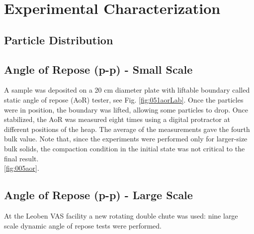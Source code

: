 
\chapter[Experimental Characterization]{Experimental Characterization}
\label{cap:experimentalcharacterization}




\section{Particle Distribution}
\label{sec:particledistribution}


\section{Angle of Repose (p-p) - Small Scale}
\label{sec:aor}

A sample was deposited on a 20 cm diameter plate with liftable boundary called
static angle of repose (\acs{AoR}) tester, see Fig. \ref{fig:051aorLab}.
Once the particles were in position, the boundary was lifted, allowing some particles to drop. 
Once stabilized, the \acs{AoR} was measured eight times using a digital protractor at different positions of the heap. 
The average of the measurements gave the fourth bulk value.
Note that, since the experiments were performed only for larger-size bulk
solids, the compaction condition in the initial state was not critical to the
final result.\\

\ref{fig:005aor}.\\


\section{Angle of Repose (p-p) - Large Scale}
\label{sec:aorlargescale}

At the Leoben VAS facility a new rotating double chute was used: 
nine large scale dynamic angle of repose tests were performed. 

